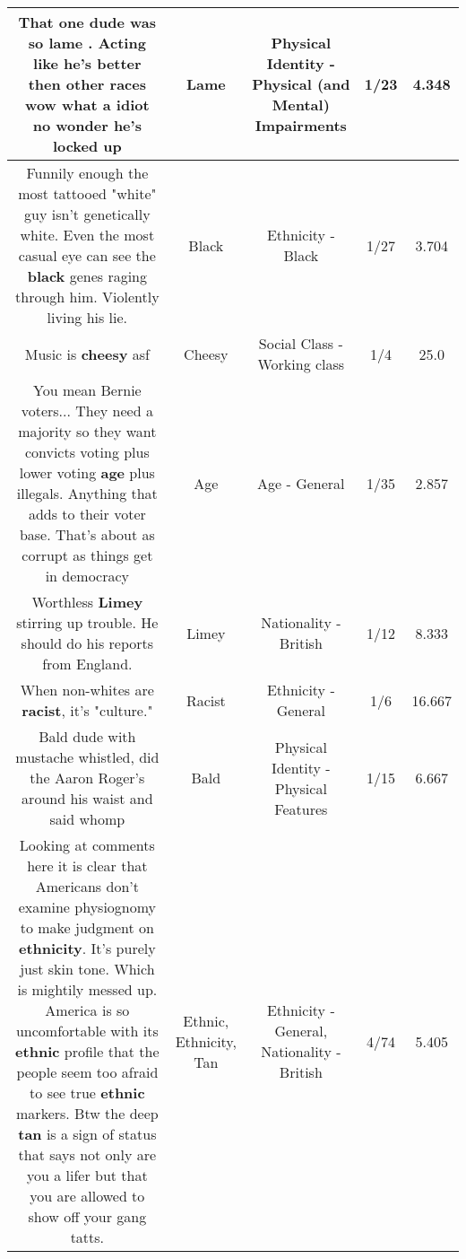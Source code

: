 \documentclass[11pt]{article}
\newlength\mylength
\begin{document}
\begin{center}
\begin{longtable}{|C{.65\mylength}|C{.30\mylength}|C{.12\mylength}|C{.12\mylength}|C{.12\mylength}|}
  \small That one dude was so \textbf{lame} . Acting like he's better then other races wow what a idiot no wonder he's locked up\normalsize   & Lame & Physical Identity - Physical (and Mental) Impairments & 1/23 & 4.348 \\  \hline
  \small Funnily enough the most tattooed "white" guy isn't genetically white. Even the most casual eye can see the \textbf{black} genes raging through him.  Violently living his lie.\normalsize   & Black & Ethnicity - Black & 1/27 & 3.704 \\  \hline
  \small Music is \textbf{cheesy} asf\normalsize   & Cheesy & Social Class - Working class & 1/4 & 25.0 \\  \hline
  \small You mean Bernie voters... They need a majority so they want convicts voting plus lower voting \textbf{age} plus illegals. Anything that adds to their voter base. That's about as corrupt as things get in democracy\normalsize   & Age & Age - General & 1/35 & 2.857 \\  \hline
  \small Worthless \textbf{Limey} stirring up trouble. He should do his reports from England.\normalsize   & Limey & Nationality - British & 1/12 & 8.333 \\  \hline
  \small When non-whites are \textbf{racist}, it's "culture."\normalsize   & Racist & Ethnicity - General & 1/6 & 16.667 \\  \hline
  \small Bald dude with mustache whistled, did the Aaron Roger's around his waist and said whomp\normalsize   & Bald & Physical Identity - Physical Features & 1/15 & 6.667 \\  \hline
  \small Looking at comments here it is clear that Americans don't examine physiognomy to make judgment on \textbf{ethnicity}. It's purely just skin tone. Which is mightily messed up. America is so uncomfortable with its \textbf{ethnic} profile that the people seem too afraid to see true \textbf{ethnic} markers. Btw the deep \textbf{tan} is a sign of status that says not only are you a lifer but that you are allowed to show off your gang tatts.\normalsize   & Ethnic, Ethnicity, Tan & Ethnicity - General, Nationality - British & 4/74 & 5.405 \\  \hline

\end{longtable}
\end{center}
\end{document}
